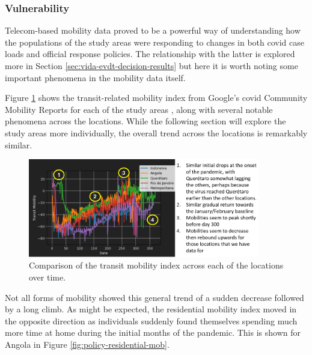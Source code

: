 \subsubsection{Vulnerability} \label{sec:vida-evdt-v-result}

Telecom-based mobility data proved to be a powerful way of understanding how the populations of the study areas were responding to changes in both \ac{covid} case loads and official response policies. The relationship with the latter is explored more in Section \ref{sec:vida-evdt-decision-results} but here it is worth noting some important phenomena in the mobility data itself.

Figure \ref{fig:transit-mobility-comparison} shows the transit-related mobility index from Google's \ac{covid} Community Mobility Reports for each of the study areas \cite{googleCOVID19CommunityMobility}, along with several notable phenomena across the locations. While the following section will explore the study areas more individually, the overall trend across the locations is remarkably similar. 

\begin{figure}[!htb]
\centering
\includegraphics[width=0.9\textwidth]{Figures/chap5/transit-mobility-comparison.png}
\caption[Transit Mobility Over Time for All Locations]{Comparison of the transit mobility index across each of the locations over time.}
\label{fig:transit-mobility-comparison}
\end{figure}

Not all forms of mobility showed this general trend of a sudden decrease followed by a long climb. As might be expected, the residential mobility index moved in the opposite direction as individuals suddenly found themselves spending much more time at home during the initial months of the pandemic. This is shown for Angola in Figure \ref{fig:policy-residential-mob}.

